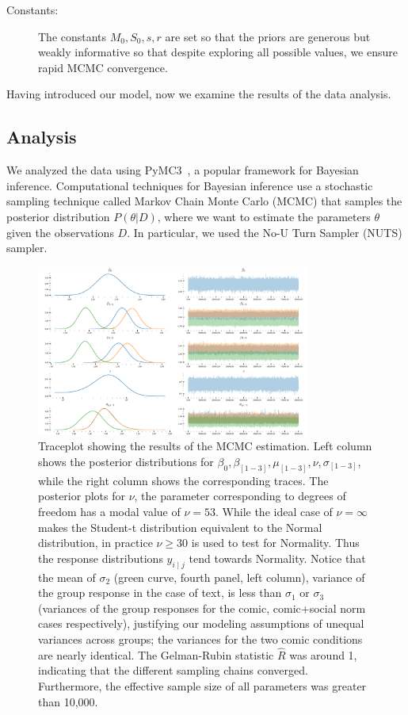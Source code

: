 \begin{description}
    \item[Constants:] The constants $M_0, S_0, s, r$ are set so that the priors are generous but weakly informative so that despite exploring all possible values, we ensure rapid MCMC convergence.
\end{description}


Having introduced our model, now we examine the results of the data analysis.


\subsection{Analysis}
\label{sub:Analysis}

We analyzed the data using PyMC3~\cite{Salvatier2016}, a popular framework for Bayesian inference. Computational techniques for Bayesian inference use a stochastic sampling technique called Markov Chain Monte Carlo (MCMC) that samples the posterior distribution $P(\theta | D)$, where we want to estimate the parameters $\theta$ given the observations $D$. In particular, we used the No-U Turn Sampler (NUTS) sampler. 

\begin{figure}
    \centering
	\includegraphics[width=0.8\textwidth]{./figures/robust_traceplot.pdf}
    \caption{Traceplot showing the results of the MCMC estimation. Left column shows the posterior distributions for $\beta_0, \beta_{[1-3]}, \mu_{[1-3]}, \nu, \sigma_{[1-3]}$, while the right column shows the corresponding traces. The posterior plots for $\nu$, the parameter corresponding to degrees of freedom has a modal value of $\nu=53$. While the ideal case of $\nu=\infty$ makes the Student-t distribution equivalent to the Normal distribution, in practice $\nu \geq 30$ is used to test for Normality. Thus the response distributions $y_{i \mid j}$ tend towards Normality. Notice that the mean of $\sigma_2$ (green curve, fourth panel, left column), variance of the group response in the case of text, is less than $\sigma_1$ or $\sigma_3$ (variances of the group responses for the comic, comic+social norm cases respectively), justifying our modeling assumptions of unequal variances across groups; the variances for the two comic conditions are nearly identical. The Gelman-Rubin statistic $\hat{R}$ was around 1, indicating that the different sampling chains converged. Furthermore, the effective sample size of all parameters was greater than 10,000. }
	\label{fig:traceplot}
\end{figure}

